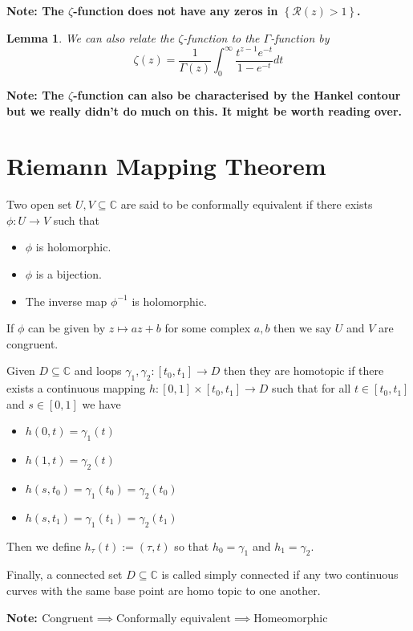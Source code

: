 \documentclass[11pt]{article}
\newcommand{\defeq}{:=}
\newcommand{\C}{\mathbb{C}}
\newenvironment{defin}
	{\begin{mdframed}[backgroundcolor=white, roundcorner=5pt, linewidth=1pt]}
	{\end{mdframed}}
\newcommand{\mdf}[1]{{\color{red} #1}}
\newenvironment{note}
	{\begin{mdframed}[backgroundcolor=white, linecolor=red, roundcorner=5pt, linewidth=1pt]\bfseries{Note:}\normalfont}
	{\end{mdframed}}
\newtheorem{lemma}[theorem]{Lemma}
\begin{document}
\begin{note}
	The $\zeta$-function does not have any zeros in $\left\{\mathcal{R}(z)>1\right\}$.
\end{note}

\begin{lemma}
We can also relate the $\zeta$-function to the $\Gamma$-function by
\[
	\zeta(z)=\frac{1}{\Gamma(z)}\int_0^\infty\frac{t^{z-1}e^{-t}}{1-e^{-t}}dt
\]
\end{lemma}

\begin{note}
The $\zeta$-function can also be characterised by the Hankel contour but we really didn't do much on this.
It might be worth reading over.
\end{note}

\section{Riemann Mapping Theorem}

\begin{defin}
	Two open set $U, V\subseteq\C$ are said to be \mdf{conformally equivalent} if there exists $\phi:U \to V$ such that
	\begin{itemize}
		\item $\phi$ is holomorphic.
		\item $\phi$ is a bijection.
		\item The inverse map $\phi^{-1}$ is holomorphic.
	\end{itemize}
	If $\phi$ can be given by $z\mapsto az+b$ for some complex $a, b$ then we say $U$ and $V$ are \mdf{congruent}.

	Given $D\subseteq\C$ and loops $\gamma_1, \gamma_2:[t_0, t_1]\to D$ then they are \mdf{homotopic} if there exists a continuous mapping $h:[0, 1]\times[t_0, t_1]\to D$ such that for all $t\in[t_0, t_1]$ and $s\in[0, 1]$ we have
	\begin{itemize}
		\item $h(0, t)= \gamma_1(t)$
		\item $h(1, t)=\gamma_2(t)$
		\item $h(s, t_0)=\gamma_1(t_0)=\gamma_2(t_0)$
		\item $h(s, t_1)= \gamma_1(t_1)=\gamma_2(t_1)$
	\end{itemize}
	Then we define $h_\tau(t)\defeq(\tau, t)$ so that $h_0=\gamma_1$ and $h_1=\gamma_2$.

	Finally, a connected set $D\subseteq\C$ is called \mdf{simply connected} if any two continuous curves with the same base point are homo topic to one another. 
\end{defin}
\begin{note}
	$\text{Congruent}\implies\text{Conformally equivalent}\implies\text{Homeomorphic}$
\end{note}
\end{document}
